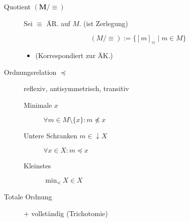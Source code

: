 \begin{mzImportant}
\begin{description}
    \item [Quotient $\mathbf{(M / \equiv)}$]
          Sei $\equiv$ ÄR. auf $M$. (ist Zerlegung)

          $$(M / \equiv) := \{ [m]_\equiv \mid m \in M \}$$

          \begin{itemize}
            \item (Korrespondiert zur ÄK.)
          \end{itemize}

    \item [Ordnungsrelation $\boldsymbol{\preceq}$]
          reflexiv, antisymmetrisch, transitiv

          \begin{description}
            \item [Minimale $x$] $\forall m \in M \setminus \{ x \}: m \not\preceq x$

            \item [Untere Schranken $m \in \downarrow X$] $\forall x \in X: m \preceq x$

            \item [Kleinstes] $\min_\preceq X \in X$
          \end{description}

    \item [Totale Ordnung] $+$ vollständig (Trichotomie)
  \end{description}
\end{mzImportant}